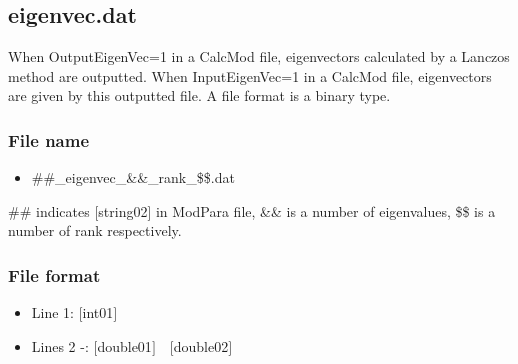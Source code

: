 \newpage
\subsection{eigenvec.dat}
\label{Subsec:eigenvec}
When OutputEigenVec=1 in a CalcMod file, eigenvectors calculated by a Lanczos method are outputted. When InputEigenVec=1 in a CalcMod file, eigenvectors are given by this outputted file. A file format is a binary type. 

\subsubsection{File name}
\begin{itemize}
   \item{\#\#\_eigenvec\_{\&\&}\_rank\_{\$\$}.dat}
\end{itemize}
  \#\# indicates [string02] in ModPara file, \&\& is a number of eigenvalues, \$\$ is a number of rank respectively.

\subsubsection{File format}
 \begin{itemize}
   \item  Line 1: $[$int01$]$
   \item  Lines 2 -: $[$double01$]$~~$[$double02$]$
  \end{itemize}
  
